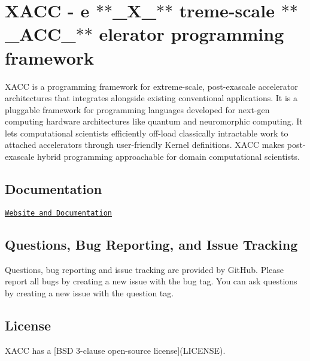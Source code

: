 \href{https://travis-ci.org/ORNL-QCI/xacc}{\tt }

\section*{X\+A\+CC -\/ e $\ast$$\ast$\+\_\+\+X\+\_\+$\ast$$\ast$ treme-\/scale $\ast$$\ast$\+\_\+\+A\+C\+C\+\_\+$\ast$$\ast$ elerator programming framework}

X\+A\+CC is a programming framework for extreme-\/scale, post-\/exascale accelerator architectures that integrates alongside existing conventional applications. It is a pluggable framework for programming languages developed for next-\/gen computing hardware architectures like quantum and neuromorphic computing. It lets computational scientists efficiently off-\/load classically intractable work to attached accelerators through user-\/friendly Kernel definitions. X\+A\+CC makes post-\/exascale hybrid programming approachable for domain computational scientists.

\subsection*{Documentation }


\begin{DoxyItemize}
\item \href{http://ORNL-QCI.github.io/xacc}{\tt Website and Documentation}
\end{DoxyItemize}

\subsection*{Questions, Bug Reporting, and Issue Tracking }

Questions, bug reporting and issue tracking are provided by Git\+Hub. Please report all bugs by creating a new issue with the bug tag. You can ask questions by creating a new issue with the question tag.

\subsection*{License }

X\+A\+CC has a \mbox{[}B\+SD 3-\/clause open-\/source license\mbox{]}(L\+I\+C\+E\+N\+SE). 